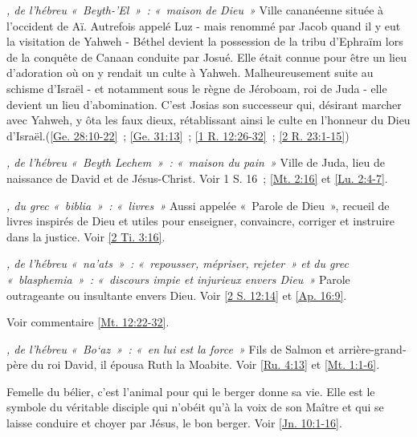 \begin{multicols}{2}
\textit{, de l'hébreu «~Beyth-'El~»~: «~maison de Dieu~»}\newline
Ville cananéenne située à l'occident de Aï. Autrefois appelé Luz - mais renommé par Jacob quand il y eut la visitation de Yahweh - Béthel devient la possession de la tribu d'Ephraïm lors de la conquête de Canaan conduite par Josué. Elle était connue pour être un lieu d'adoration où on y rendait un culte à Yahweh. Malheureusement suite au schisme d'Israël - et notamment sous le règne de Jéroboam, roi de Juda - elle devient un lieu d'abomination. C'est Josias son successeur qui, désirant marcher avec Yahweh, y ôta les faux dieux, rétablissant ainsi le culte en l'honneur du Dieu d'Israël.\newline (\vref{Ge. 28:10-22}~; \vref{Ge. 31:13}~; \vref{1 R. 12:26-32}~; \vref{2 R. 23:1-15})

\textit{, de l'hébreu «~Beyth Lechem~»~: «~maison du pain~»}\newline
Ville de Juda, lieu de naissance de David et de Jésus-Christ. Voir 1 S. 16~; \vref{Mt. 2:16} et \vref{Lu. 2:4-7}.

\textit{, du grec «~biblia~»~: «~livres~»}\newline
Aussi appelée «~Parole de Dieu~», recueil de livres inspirés de Dieu et utiles pour enseigner, convaincre, corriger et instruire dans la justice. Voir \vref{2 Ti. 3:16}.

\textit{, de l'hébreu «~na'ats~»~: «~repousser, mépriser, rejeter~» et du grec «~blasphemia~»~: «~discours impie et injurieux envers Dieu~»}\newline
Parole outrageante ou insultante envers Dieu. Voir \vref{2 S. 12:14} et \vref{Ap. 16:9}.

\textit{}\newline
Voir commentaire \vref{Mt. 12:22-32}.

\textit{, de l'hébreu «~Bo`az~»~: «~en lui est la force~»}\newline
Fils de Salmon et arrière-grand-père du roi David, il épousa Ruth la Moabite. Voir \vref{Ru. 4:13} et \vref{Mt. 1:1-6}.

\textit{}\newline
Femelle du bélier, c'est l'animal pour qui le berger donne sa vie. Elle est le symbole du véritable disciple qui n'obéit qu'à la voix de son Maître et qui se laisse conduire et choyer par Jésus, le bon berger. Voir \vref{Jn. 10:1-16}.


\end{multicols}
